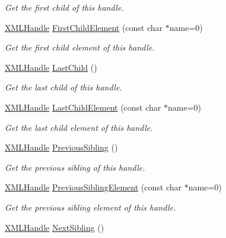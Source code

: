 \begin{DoxyCompactItemize}
\begin{DoxyCompactList}\small\item\em Get the first child of this handle. \end{DoxyCompactList}\item 
\hyperlink{classtinyxml2_1_1_x_m_l_handle}{X\+M\+L\+Handle} \hyperlink{classtinyxml2_1_1_x_m_l_handle_a74b04dd0f15e0bf01860e282b840b6a3}{First\+Child\+Element} (const char $\ast$name=0)
\begin{DoxyCompactList}\small\item\em Get the first child element of this handle. \end{DoxyCompactList}\item 
\hyperlink{classtinyxml2_1_1_x_m_l_handle}{X\+M\+L\+Handle} \hyperlink{classtinyxml2_1_1_x_m_l_handle_a9d09f04435f0f2f7d0816b0198d0517b}{Last\+Child} ()
\begin{DoxyCompactList}\small\item\em Get the last child of this handle. \end{DoxyCompactList}\item 
\hyperlink{classtinyxml2_1_1_x_m_l_handle}{X\+M\+L\+Handle} \hyperlink{classtinyxml2_1_1_x_m_l_handle_a42cccd0ce8b1ce704f431025e9f19e0c}{Last\+Child\+Element} (const char $\ast$name=0)
\begin{DoxyCompactList}\small\item\em Get the last child element of this handle. \end{DoxyCompactList}\item 
\hyperlink{classtinyxml2_1_1_x_m_l_handle}{X\+M\+L\+Handle} \hyperlink{classtinyxml2_1_1_x_m_l_handle_a428374e756f4db4cbc287fec64eae02c}{Previous\+Sibling} ()
\begin{DoxyCompactList}\small\item\em Get the previous sibling of this handle. \end{DoxyCompactList}\item 
\hyperlink{classtinyxml2_1_1_x_m_l_handle}{X\+M\+L\+Handle} \hyperlink{classtinyxml2_1_1_x_m_l_handle_a786957e498039554ed334cdc36612a7e}{Previous\+Sibling\+Element} (const char $\ast$name=0)
\begin{DoxyCompactList}\small\item\em Get the previous sibling element of this handle. \end{DoxyCompactList}\item 
\hyperlink{classtinyxml2_1_1_x_m_l_handle}{X\+M\+L\+Handle} \hyperlink{classtinyxml2_1_1_x_m_l_handle_aad2eccc7c7c7b18145877c978c3850b5}{Next\+Sibling} ()

\end{DoxyCompactItemize}
